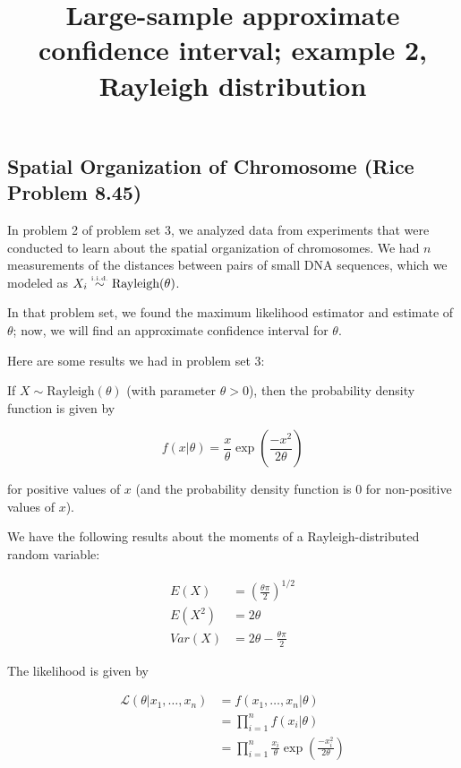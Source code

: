 \documentclass[]{article}
\title{Large-sample approximate confidence interval; example 2, Rayleigh
distribution}
\author{}
\date{}
\begin{document}
\maketitle

\def\simiid{\stackrel{{\mbox{\text{\tiny i.i.d.}}}}{\sim}}

\subsection{Spatial Organization of Chromosome (Rice Problem
8.45)}\label{spatial-organization-of-chromosome-rice-problem-8.45}

In problem 2 of problem set 3, we analyzed data from experiments that
were conducted to learn about the spatial organization of chromosomes.
We had \(n\) measurements of the distances between pairs of small DNA
sequences, which we modeled as \(X_i \simiid \text{Rayleigh}(\theta)\).

In that problem set, we found the maximum likelihood estimator and
estimate of \(\theta\); now, we will find an approximate confidence
interval for \(\theta\).

Here are some results we had in problem set 3:

If \(X \sim \text{Rayleigh}(\theta)\) (with parameter \(\theta > 0\)),
then the probability density function is given by

\[f(x | \theta) = \frac{x}{\theta} \exp \left( \frac{-x^2}{2 \theta} \right)\]

for positive values of \(x\) (and the probability density function is 0
for non-positive values of \(x\)).

We have the following results about the moments of a
Rayleigh-distributed random variable:

\begin{align*}
E(X) &= \left( \frac{\theta \pi}{2} \right)^{1/2} \\
E(X^2) &= 2 \theta \\
Var(X) &= 2 \theta - \frac{\theta \pi}{2}
\end{align*}

The likelihood is given by

\begin{align*}
\mathcal{L}(\theta | x_1, \ldots, x_n) &= f(x_1, \ldots, x_n | \theta) \\
 &= \prod_{i=1}^n f(x_i | \theta) \\
 &= \prod_{i=1}^n \frac{x_i}{\theta} \exp \left( \frac{-x_i^2}{2 \theta} \right)
\end{align*}
\end{document}
